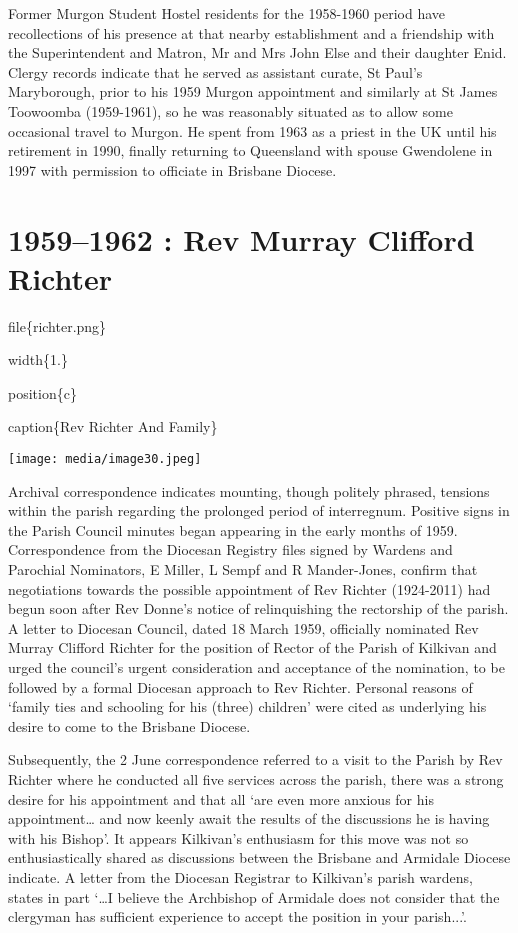 Former Murgon Student Hostel residents for the 1958-1960 period have recollections of his presence at that nearby establishment and a friendship with the Superintendent and Matron, Mr and Mrs John Else and their daughter Enid. Clergy records indicate that he served as assistant curate, St Paul's Maryborough, prior to his 1959 Murgon appointment and similarly at St James Toowoomba (1959-1961), so he was reasonably situated as to allow some occasional travel to Murgon. He spent from 1963 as a priest in the UK until his retirement in 1990, finally returning to Queensland with spouse Gwendolene in 1997 with permission to officiate in Brisbane Diocese.

\hypertarget{rev-murray-clifford-richter}{%
\chapter{1959--1962 : Rev Murray Clifford Richter}\label{rev-murray-clifford-richter}}

file\{richter.png\}

width\{1.\}

position\{c\}

caption\{Rev Richter And Family\}

\texttt{[image: media/image30.jpeg]}

Archival correspondence indicates mounting, though politely phrased, tensions within the parish regarding the prolonged period of interregnum. Positive signs in the Parish Council minutes began appearing in the early months of 1959. Correspondence from the Diocesan Registry files signed by Wardens and Parochial Nominators, E Miller, L Sempf and R Mander-Jones, confirm that negotiations towards the possible appointment of Rev Richter (1924-2011) had begun soon after Rev Donne's notice of relinquishing the rectorship of the parish. A letter to Diocesan Council, dated 18 March 1959, officially nominated Rev Murray Clifford Richter for the position of Rector of the Parish of Kilkivan and urged the council's urgent consideration and acceptance of the nomination, to be followed by a formal Diocesan approach to Rev Richter. Personal reasons of `family ties and schooling for his (three) children' were cited as underlying his desire to come to the Brisbane Diocese.

Subsequently, the 2 June correspondence referred to a visit to the Parish by Rev Richter where he conducted all five services across the parish, there was a strong desire for his appointment and that all `are even more anxious for his appointment\ldots{} and now keenly await the results of the discussions he is having with his Bishop'. It appears Kilkivan's enthusiasm for this move was not so enthusiastically shared as discussions between the Brisbane and Armidale Diocese indicate. A letter from the Diocesan Registrar to Kilkivan's parish wardens, states in part `\ldots I believe the Archbishop of Armidale does not consider that the clergyman has sufficient experience to accept the position in your parish...'.

